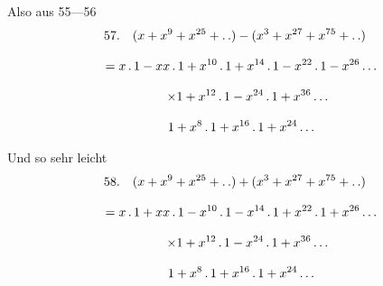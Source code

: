 Also aus 55---56
\[
\begin{gathered}
57.\quad{}
(x+x^9+x^{25}+ .\,. )-(x^3+x^{27}+x^{75}+ .\,. )\\[8pt]
\quad=x\,.\,1-xx\,.\,1+x^{10}\,.\,1+x^{14}\,.\,1-x^{22}\,.\,1-x^{26}\mathinner{.\,.\,.}\\[8pt]
\qquad\times1+x^{12}\,.\,1-x^{24}\,.\,1+x^{36}\mathinner{.\,.\,.}\\[8pt]\quad{}1+x^8\,.\,1+x^{16}\,.\,1+x^{24}\mathinner{.\,.\,.}
\end{gathered}
\]


Und so sehr leicht
\[
\begin{gathered}
58.\quad{}
(x+x^9+x^{25}+ .\,. )+(x^3+x^{27}+x^{75}+ .\,. )\\[8pt]
\quad=x\,.\,1+xx\,.\,1-x^{10}\,.\,1-x^{14}\,.\,1+x^{22}\,.\,1+x^{26}\mathinner{.\,.\,.}\\[8pt]
\qquad\times1+x^{12}\,.\,1-x^{24}\,.\,1+x^{36}\mathinner{.\,.\,.}\\[8pt]\quad{}1+x^8\,.\,1+x^{16}\,.\,1+x^{24}\mathinner{.\,.\,.}
\end{gathered}
\]

\clearpage
\endgroup
